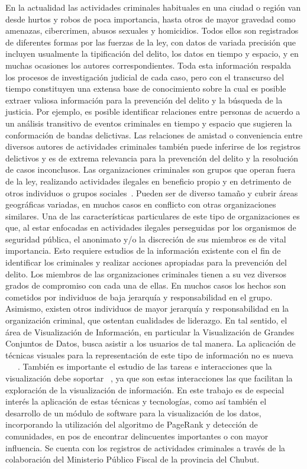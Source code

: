 
En la actualidad las actividades criminales habituales en una ciudad o región van desde hurtos y robos de poca importancia, hasta otros de mayor gravedad como amenazas, cibercrimen, abusos sexuales y  homicidios. Todos ellos son registrados de diferentes formas por las fuerzas de la ley, con datos de variada precisión que incluyen usualmente la tipificación del delito, los datos en tiempo y espacio, y en muchas ocasiones los autores correspondientes.
Toda esta información respalda los procesos de investigación judicial de cada caso, pero con el transcurso del tiempo constituyen una extensa base de conocimiento sobre la cual es posible extraer valiosa información para la prevención del delito y la búsqueda de la justicia. Por ejemplo, es posible identificar relaciones entre personas de acuerdo a un análisis transitivo de eventos criminales en tiempo y espacio que sugieren la conformación de bandas delictivas. Las relaciones de amistad o conveniencia entre diversos autores de actividades criminales también puede inferirse de los registros delictivos y es de extrema relevancia para la prevención del delito y la resolución de casos inconclusos.
Las organizaciones criminales son grupos que operan fuera de la ley, realizando actividades ilegales en beneficio propio y en detrimento de otros individuos o grupos sociales~\cite{finckenauer2005problems}. Pueden ser de diverso tamaño y cubrir áreas geográficas variadas, en muchos casos en conflicto con otras organizaciones similares. Una de las características particulares de este tipo de organizaciones es que, al estar enfocadas en actividades ilegales perseguidas por los organismos de seguridad pública, el anonimato y/o la discreción de sus miembros es de vital importancia. Esto requiere estudios de la información existente con el fin de identificar los criminales y realizar acciones apropiadas para la prevención del delito.
Los miembros de las organizaciones criminales tienen a su vez diversos grados de compromiso con cada una de ellas. En muchos casos los hechos son cometidos por individuos de baja jerarquía y responsabilidad en el grupo. Asimismo, existen otros individuos de mayor jerarquía y responsabilidad en la organización criminal, que ostentan cualidades de liderazgo.
En tal sentido, el área de Visualización de Información, en particular la Visualización de Grandes Conjuntos de Datos, busca asistir a los usuarios de tal manera. La aplicación de técnicas visuales para la representación de este tipo de información no es nueva ~\cite{xu2005criminal}~\cite{feng2019big}~\cite{mathew2021criminal}. También es importante el estudio de las tareas e interacciones que la visualización debe soportar ~\cite{chen2005visualization}, ya que son estas interacciones las que facilitan la exploración de la visualización de información.
En este trabajo es de especial interés la aplicación de estas técnicas y tecnologías, como así también el desarrollo de un módulo de software para la visualización de los datos, incorporando la utilización del algoritmo de PageRank y detección de comunidades, en pos de encontrar delincuentes importantes o con mayor influencia. Se cuenta con los registros de actividades criminales a través de la colaboración del Ministerio Público Fiscal de la provincia del Chubut.
